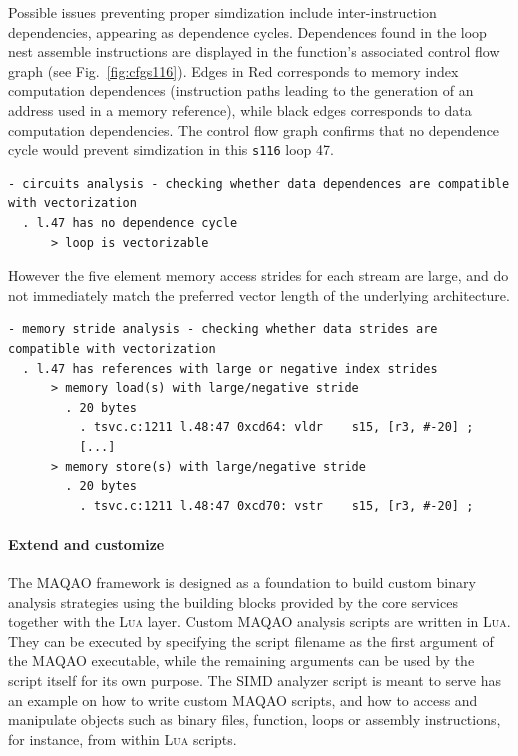 \documentclass[11pt, a4paper, twoside]{montblanc2}
\def\lua{\textsc{Lua}\xspace}
\begin{document}
Possible issues preventing proper simdization include inter-instruction
dependencies, appearing as dependence cycles. Dependences found in the loop nest
assemble instructions are displayed in the function's associated control flow
graph (see Fig.~\ref{fig:cfgs116}). Edges in Red corresponds to memory index computation
dependences (instruction paths leading to the generation of an address used in a
memory reference), while black edges corresponds to data computation dependencies. 
The control flow graph confirms that no dependence cycle would prevent
simdization in this \texttt{s116} loop 47.

\begin{small}
\begin{verbatim}
- circuits analysis - checking whether data dependences are compatible with vectorization
  . l.47 has no dependence cycle
      > loop is vectorizable
\end{verbatim}
\end{small}

However the five element memory access strides for each stream are large, and do not immediately
match the preferred vector length of the underlying architecture.

\begin{small}
\begin{verbatim}
- memory stride analysis - checking whether data strides are compatible with vectorization
  . l.47 has references with large or negative index strides
      > memory load(s) with large/negative stride
        . 20 bytes
          . tsvc.c:1211 l.48:47 0xcd64: vldr	s15, [r3, #-20] ;
          [...]
      > memory store(s) with large/negative stride
        . 20 bytes
          . tsvc.c:1211 l.48:47 0xcd70: vstr	s15, [r3, #-20] ;
\end{verbatim}
\end{small}

\paragraph{Extend and customize}

The MAQAO framework is designed as a foundation to build custom binary analysis strategies using the 
building blocks provided by the core services together with the \lua layer. Custom MAQAO analysis 
scripts are written in \lua. They can be executed by specifying the script filename as the first 
argument of the MAQAO executable, while the remaining arguments can be used by the script itself for 
its own purpose. The SIMD analyzer script is meant to serve has an example on how to write custom 
MAQAO scripts, and how to access and manipulate objects such as binary files, function, loops or 
assembly instructions, for instance, from within \lua scripts.
\end{document}
